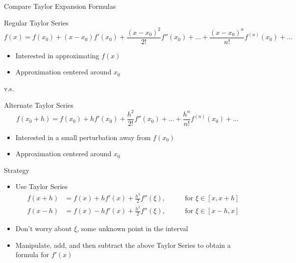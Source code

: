 \documentclass[10pt]{beamer}
\begin{document}
\begin{frame}{Compare Taylor Expansion Formulas}


\begin{block}{
Regular Taylor Series
}
    $$
        f(x) =  f(x_0) + (x-x_0) f'(x_0) + \frac{(x-x_0)^2}{2!} f''(x_0) + \dots + \frac{(x-x_0)^n}{n!} f^{(n)}(x_0)+\dots
    $$
\begin{itemize}
    \item Interested in approximating $f(x)$ 
    \item Approximation centered around $x_0$
\end{itemize}
\end{block}

\begin{center}
    v.s.
\end{center}

\begin{block}{ Alternate Taylor Series }
    $$
        f(x_0 + h) =  f(x_0) + h f'(x_0) + \frac{h^2}{2!} f''(x_0) + \dots + \frac{h^n}{n!} f^{(n)}(x_0)+\dots
    $$
    \begin{itemize}
    \item Interested in a small perturbation away from $f(x_0)$ 
    \item Approximation centered around $x_0$
\end{itemize}
\end{block}

\end{frame}
\begin{frame}{Strategy}
\begin{itemize}
    \item Use Taylor Series
    \begin{align*}
        f(x+h) &= f(x) + h f'(x) + \frac{h^2}{2}f''(\xi),\;\;\;\;\;\;\;\;\; \mbox{ for } \xi \in [x, x+h]\\
        f(x-h) &= f(x) - h f'(x) + \frac{h^2}{2}f''(\xi),\;\;\;\;\;\;\;\;\; \mbox{ for } \xi \in [x-h, x]
    \end{align*}
    \item Don't worry about $\xi$, some unknown point in the interval
    \item Manipulate, add, and then subtract the above Taylor Series to obtain a formula for $f'(x)$
\end{itemize}
\end{frame}
\end{document}
